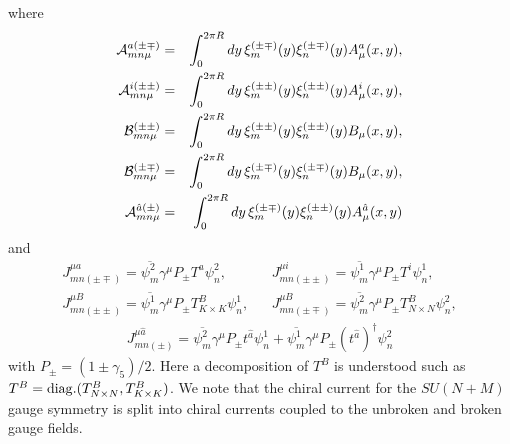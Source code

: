 \documentclass[a4paper,12pt]{article}
\begin{document}
where
\begin{eqnarray}
{\cal A}^{a(\pm\mp)}_{mn\mu}&=&\int_0^{2\pi R}dy \,
\xi^{(\pm\mp)}_m(y)\xi^{(\pm\mp)}_n(y)A^{a}_\mu(x,y), \\
{\cal A}^{i(\pm\pm)}_{mn\mu}&=&\int_0^{2\pi R}dy \,
\xi^{(\pm\pm)}_m(y)\xi^{(\pm\pm)}_n(y)A^{i}_\mu(x,y), \\
{\cal B}^{(\pm\pm)}_{mn\mu}&=&\int_0^{2\pi R}dy \,
\xi^{(\pm\pm)}_m(y)\xi^{(\pm\pm)}_n(y)B_\mu(x,y), \\
{\cal B}^{(\pm\mp)}_{mn\mu}&=&\int_0^{2\pi R}dy \,
\xi^{(\pm\mp)}_m(y)\xi^{(\pm\mp)}_n(y)B_\mu(x,y), \\
{\cal A}^{{\hat a}(\pm)}_{mn\mu}&=&\int_0^{2\pi R}dy \,
\xi^{(\pm\mp)}_m(y)\xi^{(\pm\pm)}_n(y)A^{\hat a}_\mu(x,y)
\end{eqnarray}
and
\begin{eqnarray}
J^{\mu a}_{mn(\pm\mp)}=\overline{\psi^2_m}\gamma^\mu
P_{\pm}T^{a}\psi^2_n,& & J^{\mu
i}_{mn(\pm\pm)}=\overline{\psi^1_m}
\gamma^\mu P_{\pm}T^{i}\psi^1_n, \\
J^{\mu B}_{mn(\pm\pm)}=\overline{\psi^1_m}\gamma^\mu
P_{\pm}T^{B}_{K\times K}\psi^1_n,& &J^{\mu B}_{mn(\pm\mp)}=\overline{\psi^2_m}
\gamma^\mu P_{\pm}T^B_{N\times N}\psi^2_n,
\end{eqnarray}
\begin{eqnarray}
J^{\mu{\hat a}}_{mn(\pm)}=\overline{\psi^2_m}\gamma^\mu
P_{\pm}t^{\hat a}\psi^1_n+\overline{\psi^1_m}\gamma^\mu
P_{\pm}(t^{\hat a})^\dagger\psi^2_n
\end{eqnarray}
with $P_{\pm}=(1\pm\gamma_5)/2$. 
Here a decomposition of $T^B$ is understood 
such as $T^B={\rm diag.}(T^B_{N\times N},T^B_{K\times K})$. 
We note that the chiral
current for the $SU(N+M)$ gauge symmetry is split into chiral
currents coupled to the unbroken and broken gauge fields. 
\end{document}
